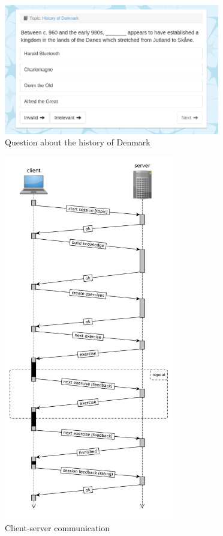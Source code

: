 \documentclass[12pt, twoside]{fithesis2}
\renewcommand{\_}{\leavevmode \kern0.07em\vbox{\hrule width0.4em}}
\begin{document}
\begin{figure}[h]
  \centering
  \includegraphics[width=0.84\textwidth]{images/question-unanswered.png}
  \caption{Question about the history of Denmark}
  \label{fig:question-unanswered}
\end{figure}


\begin{figure}[h]
  \centering
  \includegraphics[width=0.66\textwidth]{images/client-server-communication.pdf}
  \caption{Client-server communication}
  \label{fig:client-server-communication}
\end{figure}
\end{document}
